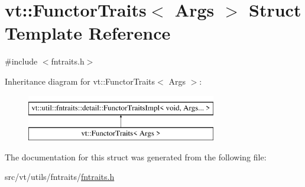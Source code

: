 \hypertarget{structvt_1_1_functor_traits}{}\section{vt\+:\+:Functor\+Traits$<$ Args $>$ Struct Template Reference}
\label{structvt_1_1_functor_traits}


{\ttfamily \#include $<$fntraits.\+h$>$}

Inheritance diagram for vt\+:\+:Functor\+Traits$<$ Args $>$\+:\begin{figure}[H]
\begin{center}
\leavevmode
\includegraphics[height=2.000000cm]{structvt_1_1_functor_traits}
\end{center}
\end{figure}


The documentation for this struct was generated from the following file\+:\begin{DoxyCompactItemize}
\item 
src/vt/utils/fntraits/\hyperlink{fntraits_8h}{fntraits.\+h}\end{DoxyCompactItemize}

